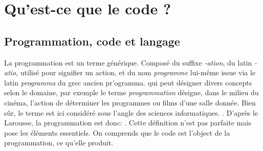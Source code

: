 \documentclass[12pt]{article} %
\begin{document}
\section{Qu'est-ce que le code ?}
\subsection{Programmation, code et langage}
La programmation est un terme générique. Composé du suffixe \textit{-ation}, du latin \textit{-atio}, utilisé pour signifier un action, et du nom \textit{programme} lui-même issue via le latin \textit{programma} du grec ancien \textgreek{pr'ogramma}.
qui peut désigner divers concepts selon le domaine, par exemple le terme \textit{programmation} désigne, dans le milieu du cinéma, l'action de déterminer les programmes ou films d'une salle donnée. Bien sûr, le terme est ici considéré sous l'angle des sciences informatiques.  \cite{Romero2017-mk}. D'après le Larousse, la programmation est donc: 
\cite{Nimmo2017-ya}. Cette définition n'est pas parfaite mais pose les éléments essentiels. On comprends que le code est l'object de la programmation, ce qu'elle produit.
\end{document}
